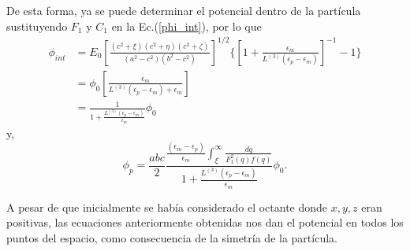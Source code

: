 De esta forma, ya se puede determinar el potencial dentro de la partícula sustituyendo $F_1$ y $C_1$ en la Ec.(\ref{phi_int}), por lo que
\begin{align}
    \phi_{int}&=E_0\left[\frac{(c^2+\xi)(c^2+\eta)(c^2+\zeta)}{(a^2-c^2)(b^2-c^2)}\right]^{1/2}\Bigg\{ \left[1+\frac{\epsilon_m}{L^{(3)}(\epsilon_p-\epsilon_m)}\right]^{-1}-1\Bigg\}\nonumber\\
    &=\phi_0 \left[\frac{\epsilon_m}{L^{(3)}(\epsilon_p-\epsilon_m)+\epsilon_m}\right]\nonumber\\
    &=\frac{1}{1+\frac{L^{(3)}(\epsilon_p-\epsilon_m)}{\epsilon_m}}\phi_0
\end{align}
y,
\begin{equation}
    \phi_p=\frac{abc}{2}\frac{\frac{(\epsilon_m-\epsilon_p)}{\epsilon_m}\int_{\xi}^{\infty}\frac{dq}{F_1^2(q)f(q)}}{1+\frac{L^{(3)}(\epsilon_p-\epsilon_m)}{\epsilon_m}}\phi_0.
\end{equation}

A pesar de que inicialmente se había considerado el octante donde $x,y,z$ eran positivas, las ecuaciones anteriormente obtenidas nos dan el potencial en todos los puntos del espacio, como consecuencia de la simetría de la partícula.\\

